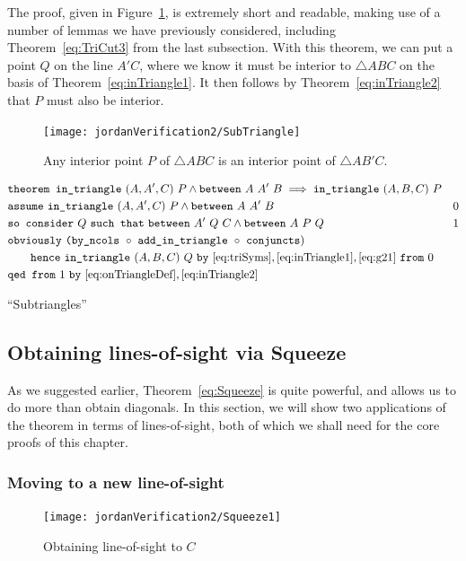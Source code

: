 The proof, given in Figure~\ref{fig:SubTriangle}, is extremely short and readable, making use of a number of lemmas we have previously considered, including Theorem~\ref{eq:TriCut3} from the last subsection. With this theorem, we can put a point $Q$ on the line $A'C$, where we know it must be interior to $\triangle ABC$ on the basis of Theorem~\ref{eq:inTriangle1}. It then follows by Theorem~\ref{eq:inTriangle2} that $P$ must also be interior.

\begin{figure}
\centering\texttt{[image: jordanVerification2/SubTriangle]}
\caption{Any interior point $P$ of $\triangle ABC$ is an interior point of $\triangle AB'C$.}
\label{fig:SubTriangle}
\end{figure}

\begin{boxedfigure}
\small
\begin{align*}
&\code{theorem }\code{in\_triangle}\ (A,A',C)\ P \wedge \between{A}{A'}{B} 
                  \implies \code{in\_triangle}\ (A,B,C)\ P\\
&\code{assume}\ \code{in\_triangle}\ (A,A',C)\ P \wedge \between{A}{A'}{B} & 0 \\
&\code{so consider}\ Q\ \code{such that}\ \between{A'}{Q}{C} \wedge \between{A}{P}{Q} & 1\\
&\code{obviously}\ \code{(by\_ncols}\ \circ\ \code{add\_in\_triangle}\ \circ\ \code{conjuncts})\\
&\qquad \code{hence}\ \code{in\_triangle}\ (A,B,C)\ Q\ \code{by}\ \eqref{eq:triSyms},\eqref{eq:inTriangle1},\eqref{eq:g21}\ \code{from}\ 0\\
&\code{qed from}\ 1\ \code{by}\ \eqref{eq:onTriangleDef},\eqref{eq:inTriangle2}
\end{align*}
\caption{``Subtriangles''}
\label{fig:SubTriangle}
\end{boxedfigure}

\subsection{Obtaining lines-of-sight via Squeeze}\label{sec:SqueezeEye}
As we suggested earlier, Theorem~\ref{eq:Squeeze} is quite powerful, and allows us to do more than obtain diagonals. In this section, we will show two applications of the theorem in terms of lines-of-sight, both of which we shall need for the core proofs of this chapter. 

\subsubsection{Moving to a new line-of-sight}\label{sec:MoveToNew}
\begin{figure}
\centering\texttt{[image: jordanVerification2/Squeeze1]}
\caption{Obtaining line-of-sight to $C$}
\label{fig:Squeeze1}
\end{figure}

